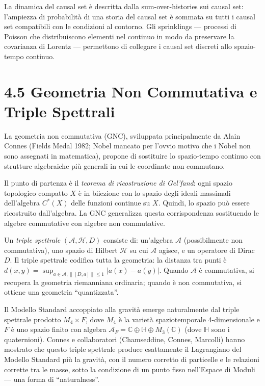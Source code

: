 \documentclass[11.5pt,a4paper,openany]{book}
\theoremstyle{remark}
\begin{document}
La dinamica del causal set è descritta dalla sum-over-histories sui causal set: l'ampiezza di probabilità di una storia del causal set è sommata su tutti i causal set compatibili con le condizioni al contorno. Gli sprinklings --- processi di Poisson che distribuiscono elementi nel continuo in modo da preservare la covarianza di Lorentz --- permettono di collegare i causal set discreti allo spazio-tempo continuo.

\section{4.5 Geometria Non Commutativa e Triple Spettrali}

La geometria non commutativa (GNC), sviluppata principalmente da Alain Connes (Fields Medal 1982; Nobel mancato per l'ovvio motivo che i Nobel non sono assegnati in matematica), propone di sostituire lo spazio-tempo continuo con strutture algebraiche più generali in cui le coordinate non commutano.

Il punto di partenza è il \textit{teorema di ricostruzione di Gel'fand}: ogni spazio topologico compatto $X$ è in biiezione con lo spazio degli ideali massimali dell'algebra $C^*(X)$ delle funzioni continue su $X$. Quindi, lo spazio può essere ricostruito dall'algebra. La GNC generalizza questa corrispondenza sostituendo le algebre commutative con algebre non commutative.

Un \textit{triple spettrale} $(\mathcal{A}, \mathcal{H}, D)$ consiste di: un'algebra $\mathcal{A}$ (possibilmente non commutativa), uno spazio di Hilbert $\mathcal{H}$ su cui $\mathcal{A}$ agisce, e un operatore di Dirac $D$. Il triple spettrale codifica tutta la geometria: la distanza tra punti è $d(x,y) = \sup_{a \in \mathcal{A}, \|[D,a]\| \leq 1} |a(x) - a(y)|$. Quando $\mathcal{A}$ è commutativa, si recupera la geometria riemanniana ordinaria; quando è non commutativa, si ottiene una geometria ``quantizzata''.

Il Modello Standard accoppiato alla gravità emerge naturalmente dal triple spettrale prodotto $M_4 \times F$, dove $M_4$ è la varietà spaziotemporale 4-dimensionale e $F$ è uno spazio finito con algebra $\mathcal{A}_F = \mathbb{C} \oplus \mathbb{H} \oplus M_3(\mathbb{C})$ (dove $\mathbb{H}$ sono i quaternioni). Connes e collaboratori (Chamseddine, Connes, Marcolli) hanno mostrato che questo triple spettrale produce esattamente il Lagrangiano del Modello Standard più la gravità, con il numero corretto di particelle e le relazioni corrette tra le masse, sotto la condizione di un punto fisso nell'Espace di Moduli --- una forma di ``naturalness''.
\end{document}
